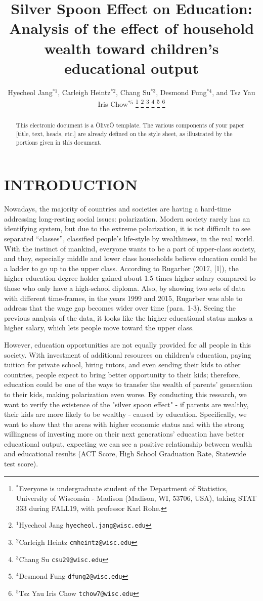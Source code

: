 \documentclass[letterpaper, 10 pt, conference]{ieeeconf}  %
\title{\LARGE \bf
Silver Spoon Effect on Education: Analysis of the effect of household wealth toward children's educational output
}
\author{Hyecheol Jang$^{*1}$, Carleigh Heintz$^{*2}$, Chang Su$^{*3}$, Desmond Fung$^{*4}$, and Tsz Yau Iris Chow$^{*5}$%
\thanks{$^{*}$Everyone is undergraduate student of the Department of  Statistics, University of Wisconsin - Madison (Madison, WI, 53706, USA), taking STAT 333 during FALL19, with professor Karl Rohe.}%
\thanks{$^{1}$Hyecheol Jang
        {\tt\small hyecheol.jang@wisc.edu}}%
\thanks{$^{2}$Carleigh Heintz
        {\tt\small cmheintz@wisc.edu}}%
\thanks{$^{3}$Chang Su
        {\tt\small csu29@wisc.edu}}%
\thanks{$^{4}$Desmond Fung
        {\tt\small dfung2@wisc.edu}}%
\thanks{$^{5}$Tsz Yau Iris Chow
        {\tt\small tchow7@wisc.edu}}%
}
\begin{document}
\maketitle
\thispagestyle{empty}
\pagestyle{empty}


\begin{abstract}

This electronic document is a ÒliveÓ template. The various components of your paper [title, text, heads, etc.] are already defined on the style sheet, as illustrated by the portions given in this document.

\end{abstract}


\section{INTRODUCTION}

Nowadays, the majority of countries and societies are having a hard-time addressing long-resting social issues: polarization.
Modern society rarely has an identifying system, but due to the extreme polarization, it is not difficult to see separated “classes”, classified people’s life-style by wealthiness, in the real world.
With the instinct of mankind, everyone wants to be a part of upper-class society, and they, especially middle and lower class households believe education could be a ladder to go up to the upper class.
According to Rugarber (2017, [1]), the higher-education degree holder gained about 1.5 times higher salary compared to those who only have a high-school diploma.
Also, by showing two sets of data with different time-frames, in the years 1999 and 2015, Rugarber was able to address that the wage gap becomes wider over time (para. 1-3).
Seeing the previous analysis of the data, it looks like the higher educational status makes a higher salary, which lets people move toward the upper class.

However, education opportunities are not equally provided for all people in this society.
With investment of additional resources on children’s education, paying tuition for private school, hiring tutors, and even sending their kids to other countries, people expect to bring better opportunity to their kids; therefore, education could be one of the ways to transfer the wealth of parents’ generation to their kids, making polarization even worse.
By conducting this research, we want to verify the existence of the "silver spoon effect" - if parents are wealthy, their kids are more likely to be wealthy - caused by education.
Specifically, we want to show that the areas with higher economic status and with the strong willingness of investing more on their next generations’ education have better educational output, expecting we can see a positive relationship between wealth and educational results (ACT Score, High School Graduation Rate, Statewide test score).
\end{document}
